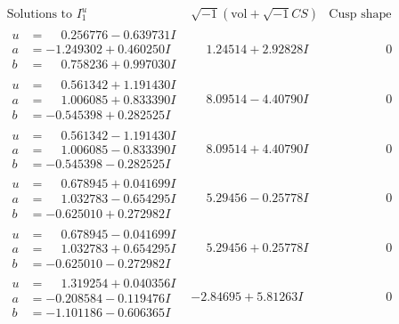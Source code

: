 \documentclass[1p]{elsarticle_modified}
\theoremstyle{definition}
\newcommand{\I}{\sqrt{-1}}
\begin{document}
$$\begin{array}{c|c|c}
\text{Solutions to }I^u_{1}& \I (\text{vol} + \sqrt{-1}CS) & \text{Cusp shape}\\
 \hline 
\begin{aligned}
u &= \phantom{-}0.256776 - 0.639731 I \\
a &= -1.249302 + 0.460250 I \\
b &= \phantom{-}0.758236 + 0.997030 I\end{aligned}
 & \phantom{-}1.24514 + 2.92828 I & \phantom{-0.000000 } 0 \\ \hline\begin{aligned}
u &= \phantom{-}0.561342 + 1.191430 I \\
a &= \phantom{-}1.006085 + 0.833390 I \\
b &= -0.545398 + 0.282525 I\end{aligned}
 & \phantom{-}8.09514 - 4.40790 I & \phantom{-0.000000 } 0 \\ \hline\begin{aligned}
u &= \phantom{-}0.561342 - 1.191430 I \\
a &= \phantom{-}1.006085 - 0.833390 I \\
b &= -0.545398 - 0.282525 I\end{aligned}
 & \phantom{-}8.09514 + 4.40790 I & \phantom{-0.000000 } 0 \\ \hline\begin{aligned}
u &= \phantom{-}0.678945 + 0.041699 I \\
a &= \phantom{-}1.032783 - 0.654295 I \\
b &= -0.625010 + 0.272982 I\end{aligned}
 & \phantom{-}5.29456 - 0.25778 I & \phantom{-0.000000 } 0 \\ \hline\begin{aligned}
u &= \phantom{-}0.678945 - 0.041699 I \\
a &= \phantom{-}1.032783 + 0.654295 I \\
b &= -0.625010 - 0.272982 I\end{aligned}
 & \phantom{-}5.29456 + 0.25778 I & \phantom{-0.000000 } 0 \\ \hline\begin{aligned}
u &= \phantom{-}1.319254 + 0.040356 I \\
a &= -0.208584 - 0.119476 I \\
b &= -1.101186 - 0.606365 I\end{aligned}
 & -2.84695 + 5.81263 I & \phantom{-0.000000 } 0 \\ \hline\begin{aligned}

\end{aligned}
\end{array}$$
\end{document}
